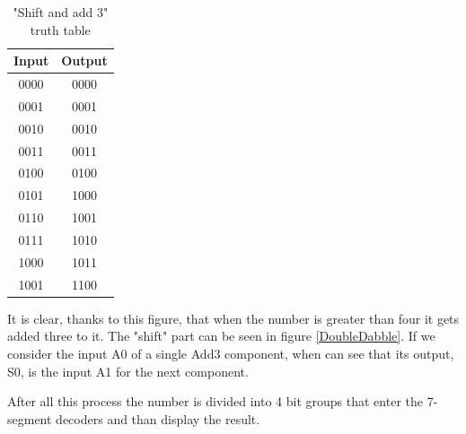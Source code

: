 \documentclass{article}
\begin{document}
\begin{table}[h]
  \centering
  \begin{tabular}{||c|c||}
    \hline
    Input & Output \\
    \hline
    0000 & 0000 \\
    0001 & 0001 \\
    0010 & 0010 \\ 
    0011 & 0011 \\
    0100 & 0100 \\
    0101 & 1000 \\
    0110 & 1001 \\
    0111 & 1010 \\
    1000 & 1011 \\
    1001 & 1100 \\
    \hline
  \end{tabular}
    \label{Add3Table}
    \caption{"Shift and add 3" truth table}
  \end{table}

It is clear, thanks to this figure, that when the number is greater than four it gets added three to it. The "shift" part can be seen in figure \ref{DoubleDabble}. If we consider the input A0 of a single Add3 component, when can see that its output, S0, is the input A1 for the next component.

After all this process the number is divided into 4 bit groups that enter the 7-segment decoders and than display the result.
\end{document}
